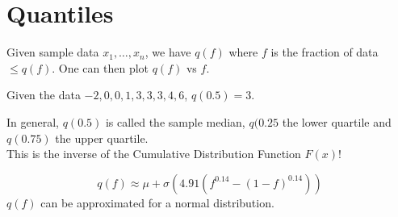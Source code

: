 \documentclass[12pt]{article}
\begin{document}
\section{Quantiles}

Given sample data $x_1,\dots,x_n$, we have $q(f)$ where $f$ is the fraction of data $\leq q(f)$. One can then plot $q(f)$ vs $f$.

\begin{ex}
	Given the data $-2,0,0,1,3,3,3,4,6$, $q(0.5) = 3$.
\end{ex}

In general, $q(0.5)$ is called the sample median, $q(0.25$ the lower quartile and $q(0.75)$ the upper quartile. \\
This is the inverse of the Cumulative Distribution Function $F(x)$!

$$q(f) \approx \mu+\sigma \left(4.91\left(f^{0.14}-(1-f)^{0.14}\right)\right)$$
$q(f)$ can be approximated for a normal distribution.
\end{document}
